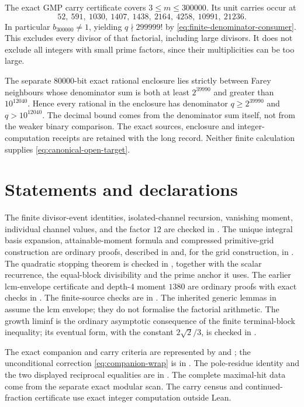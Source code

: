\documentclass[11pt]{article}
\begin{document}
The exact GMP carry certificate covers $3\le m\le300000$.  Its unit carries
occur at
\[
52,\ 591,\ 1030,\ 1407,\ 1438,\ 2164,\ 4258,\ 10991,\ 21236.
\]
In particular $b_{300000}\ne1$, yielding $q\nmid299999!$ by
\eqref{eq:finite-denominator-consumer}.  This excludes every divisor of that
factorial, including large divisors.  It does not exclude all integers with
small prime factors, since their multiplicities can be too large.

The separate $80000$-bit exact rational enclosure lies strictly between
Farey neighbours whose denominator sum is both at least $2^{39990}$ and
greater than $10^{12040}$.  Hence every rational in the enclosure has
denominator $q\ge2^{39990}$ and $q>10^{12040}$.  The decimal bound comes from
the denominator sum itself, not from the weaker binary comparison.  The exact
sources, enclosure and integer-computation receipts are retained with the
long record.  Neither finite calculation supplies
\eqref{eq:canonical-open-target}.

\section*{Statements and declarations}\label{app:sources}

\begingroup\small\raggedright
The finite divisor-event identities, isolated-channel recursion, vanishing
moment, individual channel values, and the factor $12$ are checked in
.  The unique integral basis expansion,
attainable-moment formula and compressed primitive-grid construction are
ordinary proofs, described in  and, for the
grid construction, in
.  The quadratic stopping theorem
is checked in , together with the
scalar recurrence, the equal-block divisibility and the prime anchor it uses.
The earlier lcm-envelope certificate and depth-$4$ moment $1380$ are
ordinary proofs with exact checks in .
The finite-source checks are in .
The inherited generic lemmas in  assume
the lcm envelope; they do not formalise the factorial arithmetic.
The growth liminf is the
ordinary asymptotic consequence of the finite terminal-block inequality; its
eventual form, with the constant $2\sqrt2/3$, is checked in
.

The exact companion and carry criteria are represented by
 and
; the unconditional correction
\eqref{eq:companion-wrap} is in .
The pole-residue identity and the two displayed reciprocal equalities are
in .  The complete maximal-hit data come from
the separate exact modular scan.  The carry census and continued-fraction
certificate use exact integer computation outside Lean.
\end{document}
